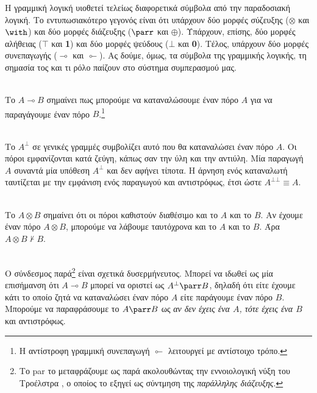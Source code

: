 \documentclass [a4paper,11pt] {book}
\theoremstyle{definition}
\theoremstyle{definition}
\begin{document}
Η γραμμική λογική υιοθετεί τελείως διαφορετικά σύμβολα από την παραδοσιακή λογική. Το εντυπωσιακότερο γεγονός είναι ότι υπάρχουν δύο μορφές σύζευξης ($\otimes$ και $\with$) και δύο μορφές διάζευξης ($\parr$ και $\oplus$). Υπάρχουν, επίσης, δύο μορφές αλήθειας ($\top$ και \textbf{1}) και δύο μορφές ψεύδους ($\bot$ και \textbf{0}). Τέλος, υπάρχουν δύο μορφές συνεπαγωγής ($\multimap$ και $\multimapinv$). Ας δούμε, όμως, τα σύμβολα της γραμμικής λογικής, τη σημασία τος και τι ρόλο παίζουν στο σύστημα συμπερασμού μας.
\begin{description}
\label{symbolsOfLinearLogic}
  \item[Γραμμική συνεπαγωγή: $\multimap$] \hfill \\
  Το $A\multimap B$ σημαίνει πως μπορούμε να καταναλώσουμε έναν πόρο $A$  για να παραγάγουμε έναν πόρο $B$.\footnote{Η αντίστροφη γραμμική συνεπαγωγή $\multimapinv$ λειτουργεί με αντίστοιχο τρόπο.}
  
  \item[Άρνηση: $^{\bot}$] \hfill \\
  Το $A^{\bot}$ σε γενικές γραμμές συμβολίζει αυτό που θα καταναλώσει έναν πόρο $A$. Οι πόροι εμφανίζονται κατά ζεύγη, κάπως σαν την ύλη και την αντιύλη. Μία παραγωγή $A$ συναντά μία υπόθεση $A^{\bot}$ και δεν αφήνει τίποτα. Η άρνηση ενός καταναλωτή ταυτίζεται με την εμφάνιση ενός παραγωγού και αντιστρόφως, έτσι ώστε $A^{\bot\bot}\equiv A$.
  
  \item[Τανυστής (πολλαπλασιαστική σύζευξη): $\otimes$] \hfill \\
  Το $A\otimes B$ σημαίνει ότι οι πόροι καθιστούν διαθέσιμο και το $A$ και το $B$. Αν έχουμε έναν πόρο $A\otimes B$, μπορούμε να λάβουμε ταυτόχρονα και το $A$ και το $B$. Άρα $A\otimes B\nvdash B$.
  
  \item[Παρά (par) (πολλαπλασιαστική διάζευξη): $\parr$] \hfill \\
  Ο σύνδεσμος παρά\footnote{Το par το μεταφράζουμε ως παρά ακολουθώντας την εννοιολογική νύξη του Τροέλστρα \citep{troelstra1992lectures}, ο οποίος το εξηγεί ως σύντμηση της \textit{παράλληλης διάζευξης}.} είναι σχετικά δυσερμήνευτος. Μπορεί να ιδωθεί ως μία επισήμανση ότι $A\multimap B$ μπορεί να οριστεί ως $A^{\bot}\parr B$, δηλαδή ότι είτε έχουμε κάτι το οποίο ζητά να καταναλώσει έναν πόρο $A$ είτε παράγουμε έναν πόρο $B$. Μπορούμε να παραφράσουμε το $A\parr B$ ως \textit{αν δεν έχεις ένα $A$, τότε έχεις ένα $B$} και αντιστρόφως.
  

\end{description}
\end{document}
